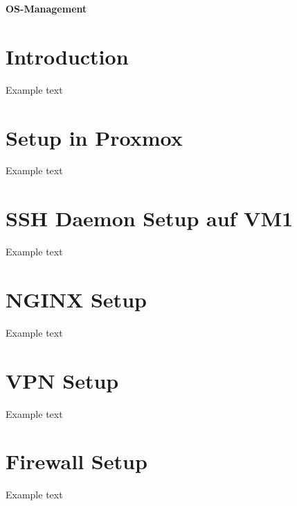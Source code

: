 \documentclass[10pt,a4paper]{article}
\begin{document}
\huge
\begin{center}
{\bf OS-Management}\par
\vspace{3cm}
\end{center}

\normalsize

\section{Introduction}
Example text

\section{Setup in Proxmox}
Example text

\section{SSH Daemon Setup auf VM1}
Example text

\section{NGINX Setup}
Example text

\section{VPN Setup}
Example text

\section{Firewall Setup}
Example text
\end{document}
